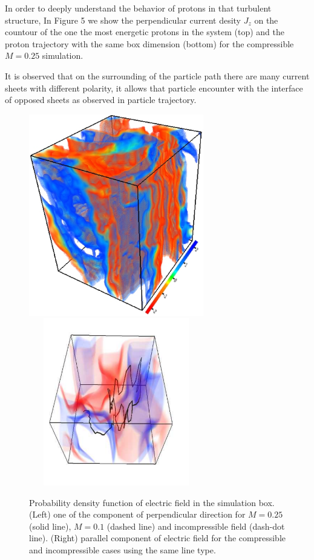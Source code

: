 \documentclass[%
aip,pop,amsmath,amssymb,
 reprint,%
]{revtex4-1}
\begin{document}
In order to deeply understand the behavior of protons in that turbulent structure, In Figure
5 we show the perpendicular current desity $J_z$ on the countour of the one the most energetic protons
in the system (top) and the proton trajectory with the same box dimension (bottom) for the compressible $M=0.25$ simulation.

It is observed that on the surrounding of the particle path there are many current sheets with different 
polarity, it allows that particle encounter with the interface of opposed sheets as observed in
particle trajectory. 

\begin{figure}[h!]
\begin{center}
{\includegraphics[width = 3in]{./Figures/Fig5_a}}
{\includegraphics[height=2.87in, width = 3in]{./Figures/Fig5_b}}
\caption{Probability density function of electric field in the simulation box. (Left) one of the 
component of perpendicular direction for $M=0.25$ (solid line), $M=0.1$ (dashed line) and incompressible field (dash-dot line). (Right) parallel component of electric field for the compressible and incompressible cases using the same line type.}
\end{center}
\label{mean square velocity}
\end{figure}
\end{document}

